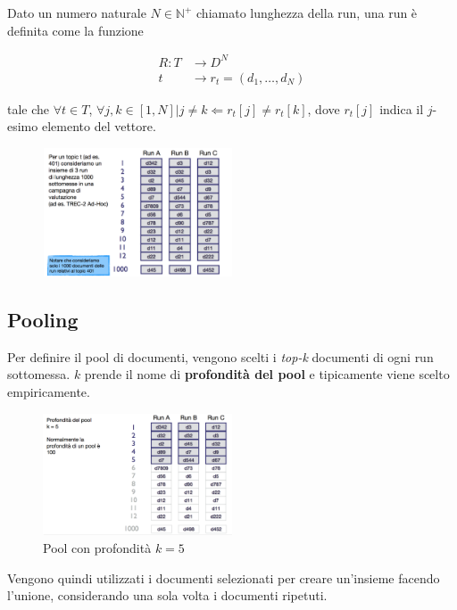 Dato un numero naturale $N \in \mathbb{N}^+$ chiamato lunghezza della run, una run è definita come la funzione

\begin{align*}
R : T &\to D^N \\
	t &\to r_t = (d_1, \ldots, d_N)
\end{align*}

\noindent tale che $\forall t \in T$, $\forall j,k \in [1,N] | j \neq k \Leftarrow r_t[j] \neq r_t[k]$, dove $r_t[j]$ indica il $j$-esimo elemento del vettore.

\begin{figure}[htbp]
	\centering
	\includegraphics[width=0.5\textwidth]{images/l14-fig-1.png}
\end{figure}


\subsection{Pooling}

Per definire il pool di documenti, vengono scelti i \textit{top-k} documenti di ogni run sottomessa. $k$ prende il nome di \textbf{profondità del pool} e tipicamente viene scelto empiricamente.

\begin{figure}[htbp]
	\centering
	\includegraphics[width=0.5\textwidth]{images/l14-fig-2.png}
	\caption{Pool con profondità $k=5$}
\end{figure}

\noindent Vengono quindi utilizzati i documenti selezionati per creare un'insieme facendo l'unione, considerando una sola volta i documenti ripetuti.

